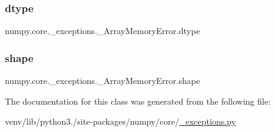 \subsubsection{\texorpdfstring{dtype}{dtype}}
{\footnotesize\ttfamily numpy.\+core.\+\_\+exceptions.\+\_\+\+Array\+Memory\+Error.\+dtype}

\mbox{\label{classnumpy_1_1core_1_1__exceptions_1_1__ArrayMemoryError_a56d704713efe186d8ee89cc0b8b46a5c}} 
\subsubsection{\texorpdfstring{shape}{shape}}
{\footnotesize\ttfamily numpy.\+core.\+\_\+exceptions.\+\_\+\+Array\+Memory\+Error.\+shape}



The documentation for this class was generated from the following file\+:\begin{DoxyCompactItemize}
\item 
venv/lib/python3./site-\/packages/numpy/core/\hyperlink{__exceptions_8py}{\+\_\+exceptions.\+py}\end{DoxyCompactItemize}
